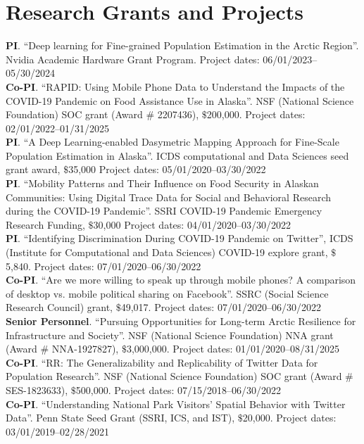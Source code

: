 \documentclass[11pt, a4paper]{article}
\begin{document}
\section*{Research Grants and Projects}
\textbf{PI}. ``Deep learning for Fine-grained Population Estimation in the Arctic Region''. Nvidia Academic Hardware Grant Program. Project dates: 06/01/2023--05/30/2024\\
\textbf{Co-PI}. ``RAPID: Using Mobile Phone Data to Understand the Impacts of the COVID-19 Pandemic on Food Assistance Use in Alaska''. NSF (National Science Foundation) SOC grant (Award \# 2207436), $\$$200,000. Project dates: 02/01/2022--01/31/2025\\
\textbf{PI}. ``A Deep Learning-enabled Dasymetric Mapping Approach for Fine-Scale Population Estimation in Alaska''. ICDS computational and Data Sciences seed grant award, $\$$35,000 Project dates: 05/01/2020--03/30/2022\\
\textbf{PI}. ``Mobility Patterns and Their Influence on Food Security in Alaskan Communities: Using Digital Trace Data for Social and Behavioral Research during the COVID-19 Pandemic''. SSRI COVID-19 Pandemic Emergency Research Funding, $\$$30,000 Project dates: 04/01/2020--03/30/2022\\
\textbf{PI}. ``Identifying Discrimination During COVID-19 Pandemic on Twitter'',  ICDS (Institute for Computational and Data Sciences) COVID-19 explore grant, $\$$5,840. Project dates: 07/01/2020--06/30/2022\\
\textbf{Co-PI}. ``Are we more willing to speak up through mobile phones?  A comparison of desktop vs. mobile political sharing on Facebook''. SSRC (Social Science Research Council) grant, $\$$49,017. Project dates: 07/01/2020--06/30/2022\\
\textbf{Senior Personnel}. ``Pursuing Opportunities for Long-term Arctic Resilience for Infrastructure and Society''. NSF (National Science Foundation) NNA grant (Award \# NNA-1927827), $\$$3,000,000. Project dates: 01/01/2020--08/31/2025\\
\textbf{Co-PI}. ``RR: The Generalizability and Replicability of Twitter Data for Population Research''. NSF (National Science Foundation) SOC grant (Award \# SES-1823633), $\$$500,000. Project dates: 07/15/2018--06/30/2022\\
\textbf{Co-PI}. ``Understanding National Park Visitors’ Spatial Behavior with Twitter Data''. Penn State Seed Grant (SSRI, ICS, and IST), $\$$20,000. Project dates: 03/01/2019--02/28/2021\\
\end{document}
